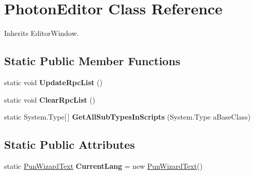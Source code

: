 \hypertarget{class_photon_editor}{}\section{Photon\+Editor Class Reference}
\label{class_photon_editor}


Inherits Editor\+Window.

\subsection*{Static Public Member Functions}
\begin{DoxyCompactItemize}
\item 
static void {\bfseries Update\+Rpc\+List} ()\hypertarget{class_photon_editor_a2b113824952b620b9f866b19cb02bb9f}{}\label{class_photon_editor_a2b113824952b620b9f866b19cb02bb9f}

\item 
static void {\bfseries Clear\+Rpc\+List} ()\hypertarget{class_photon_editor_a7b6ed3bf9fe915eb2bcbb2145a60e8f2}{}\label{class_photon_editor_a7b6ed3bf9fe915eb2bcbb2145a60e8f2}

\item 
static System.\+Type\mbox{[}$\,$\mbox{]} {\bfseries Get\+All\+Sub\+Types\+In\+Scripts} (System.\+Type a\+Base\+Class)\hypertarget{class_photon_editor_ad4d13d2a6ea1da5d6b2a7a59547320ff}{}\label{class_photon_editor_ad4d13d2a6ea1da5d6b2a7a59547320ff}

\end{DoxyCompactItemize}
\subsection*{Static Public Attributes}
\begin{DoxyCompactItemize}
\item 
static \hyperlink{class_pun_wizard_text}{Pun\+Wizard\+Text} {\bfseries Current\+Lang} = new \hyperlink{class_pun_wizard_text}{Pun\+Wizard\+Text}()\hypertarget{class_photon_editor_addb01f74196c19993905e90bc0a32b50}{}\label{class_photon_editor_addb01f74196c19993905e90bc0a32b50}

\end{DoxyCompactItemize}
